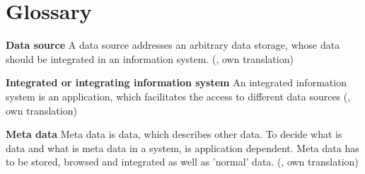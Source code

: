\chapter{Glossary}

\textbf{Data source} A data source addresses an arbitrary data storage, whose data should be integrated in an information system. (\cite[p. 7]{DBLP:books/dp/LeserN2006}, own translation)

\textbf{Integrated or integrating information system} An integrated information system is an application, which facilitates the access to different data sources (\cite[p. 7]{DBLP:books/dp/LeserN2006}, own translation)

\textbf{Meta data} Meta data is data, which describes other data. To decide what is data and what is meta data in a system, is application dependent. Meta data has to be stored, browsed and integrated as well as 'normal' data. (\cite[p. 8]{DBLP:books/dp/LeserN2006}, own translation)